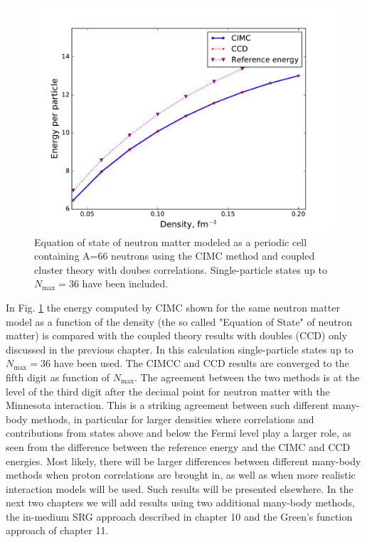 \begin{figure}
	\begin{center}
		\includegraphics[scale=0.5]{Chapter9-figures/cimcccd.pdf}
	\end{center}
	\caption{Equation of state of neutron matter modeled as a periodic cell containing A=66 neutrons using the CIMC method and coupled cluster theory with doubes correlations. Single-particle states up to $N_{\mathrm{max}}=36$ have been included.}
	\label{fig.cimc_eos}
\end{figure}

In Fig. \ref{fig.cimc_eos} the energy computed by CIMC shown for the same neutron matter model as a function of the density (the so called "Equation of State" of neutron matter) is compared with the coupled theory results with doubles (CCD) only discussed in the previous chapter. 
In this calculation single-particle states up to $N_{\mathrm{max}}=36$ have been used. The CIMCC and CCD results are converged to the fifth digit as function of 
$N_{\mathrm{max}}$. The agreement between the two methods is at the level of the third digit after the decimal point for neutron matter with the 
Minnesota interaction. This is a striking agreement between such different many-body methods, in particular for larger densities where correlations and contributions from states above and below the Fermi level play a larger role, as seen from the difference between the reference energy and the CIMC and CCD energies.
Most likely, there will be larger differences between different many-body methods when proton correlations are brought in, as well as when more realistic interaction models will be used. Such results will be presented elsewhere. In the next two chapters we will add results using two  additional many-body methods, the in-medium SRG approach described in chapter 10 and the Green's function approach of chapter 11.  

